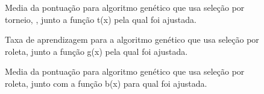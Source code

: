 \documentclass[10pt,a4paper]{article}
\begin{document}
\begin{figure}[H]
  \center
  \caption{Media da pontuação para algoritmo genético que usa seleção por torneio, , junto a função t(x) pela qual foi ajustada.}
  \label{fig:taxaAprendizagem2Torneio}
\end{figure}
\begin{figure}[H]
  \center
  \caption{Taxa de aprendizagem para a algoritmo genético que usa seleção por roleta, junto a função g(x) pela qual foi ajustada.}
  \label{fig:taxaAprendizagemRoleta}
\end{figure}
\begin{figure}[H]
  \center
  \caption{Media da pontuação para  algoritmo genético que usa seleção por roleta, junto com a função b(x) para qual foi ajustada.}
  \label{fig:taxaAprendizagem2Roleta}
\end{figure}
\end{document}

